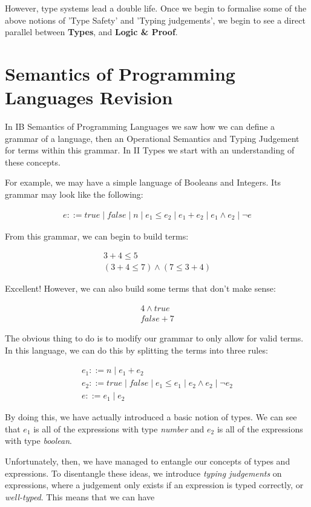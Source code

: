 \documentclass{article}
\newcommand{\inlineeq}[1]{
    \vspace{-2em}
    \begin{gather*}
    #1
    \end{gather*}
    \vspace{-2em}
}
\begin{document}
However, type systems lead a double life. Once we begin to formalise some of the above notions of 'Type Safety' and 'Typing judgements', we begin to see a direct parallel between \textbf{Types}, and \textbf{Logic \& Proof}. 

\section{Semantics of Programming Languages Revision}

In IB Semantics of Programming Languages we saw how we can define a grammar of a language, then an Operational Semantics and Typing Judgement for terms within this grammar. In II Types we start with an understanding of these concepts.

For example, we may have a simple language of Booleans and Integers. Its grammar may look like the following:

\inlineeq{
e ::= true \; | \; false \; | \; n \; | \; e_1 \leq e_2 \; | \; e_1 + e_2 \; | \; e_1 \land e_2 \; | \; \lnot e
}

From this grammar, we can begin to build terms:

\inlineeq{
3 + 4 \leq 5 \\
(3 + 4 \leq 7) \land (7 \leq 3 + 4) 
}

Excellent! However, we can also build some terms that don't make sense:

\inlineeq{
4 \land true \\
false + 7
}

The obvious thing to do is to modify our grammar to only allow for valid terms. In this language, we can do this by splitting the terms into three rules:

\inlineeq{
e_1 ::= n \; | \; e_1 + e_2 \\
e_2 ::= true \; | \; false \; | \; e_1 \leq e_1 \; | \; e_2 \land e_2 \; | \; \lnot e_2 \\
e ::= e_1 \; | \; e_2
}

By doing this, we have actually introduced a basic notion of types. We can see that $e_1$ is all of the expressions with type \textit{number} and $e_2$ is all of the expressions with type \textit{boolean}.

Unfortunately, then, we have managed to entangle our concepts of types and expressions. To disentangle these ideas, we introduce \textit{typing judgements} on expressions, where a judgement only exists if an expression is typed correctly, or \textit{well-typed}. This means that we can have 
\end{document}
